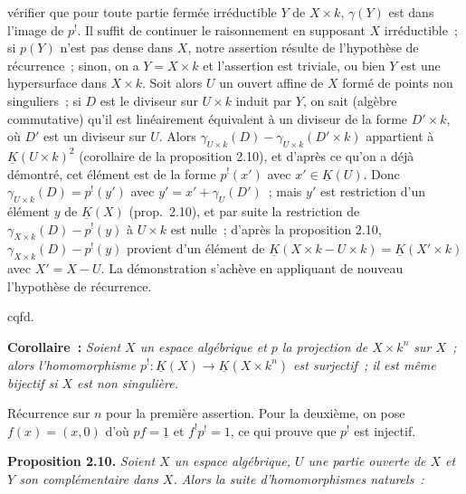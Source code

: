 vérifier que pour toute partie fermée irréductible $Y$ de $X\times k$, $\gamma(Y)$ est dans l'image de $p^!$. Il suffit de continuer le raisonnement en supposant $X$ irréductible~; si $p(Y)$ n'est pas dense dans $X$, notre assertion résulte de l'hypothèse de récurrence~; sinon, on a $Y=X\times k$ et l'assertion est triviale, ou bien $Y$ est une hypersurface dans $X\times k$. Soit alors $U$ un ouvert affine de $X$ formé de points non singuliers~; si $D$ est le diviseur sur $U\times k$ induit par $Y$, on sait (algèbre commutative) qu'il est linéairement équivalent à un diviseur de la forme $D'\times k$, où $D'$ est un diviseur sur $U$. Alors $\gamma_{U\times k}(D)-\gamma_{U\times k}(D'\times k)$ appartient à $\underline K(U\times k)^2$ (corollaire de la proposition 2.10), et d'après ce qu'on a déjà démontré, cet élément est de la forme $p^!(x')$ avec $x'\in\underline K(U)$. Donc $\gamma_{U\times k}(D)=p^!(y')$ avec $y'=x'+\gamma_U(D')$~; mais $y'$ est restriction d'un élément $y$ de $\underline K(X)$ (prop.\ 2.10), et par suite la restriction de $\gamma_{X\times k}(D)-p^!(y)$ à $U\times k$ est nulle~; d'après la proposition 2.10, $\gamma_{X\times k}(D)-p^!(y)$ provient d'un élément de $\underline K(X\times k-U\times k)=\underline K(X'\times k)$ avec $X'=X-U$. La démonstration s'achève en appliquant de nouveau l'hypothèse de récurrence.
\begin{flushright}cqfd.\end{flushright}

\textbf{Corollaire~:} \emph{Soient $X$ un espace algébrique et $p$ la projection de $X\times k^n$ sur $X$~; alors l'homomorphisme $p^!:\underline K(X)\longrightarrow\underline K(X\times k^n)$ est surjectif~; il est même bijectif si $X$ est non singulière.}

Récurrence sur $n$ pour la première assertion. Pour la deuxième, on pose $f(x)=(x,0)$ d'où $pf=\underline{1}$ et $f^!p^!=1$, ce qui prouve que $p^!$ est injectif.

\textbf{Proposition 2.10.} \emph{Soient $X$ un espace algébrique, $U$ une partie ouverte de $X$ et $Y$ son complémentaire dans $X$. Alors la suite d'homomorphismes naturels~:}
